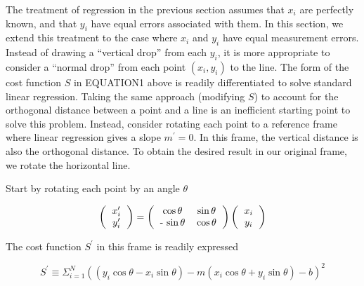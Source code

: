 \documentclass{article}
\begin{document}
The treatment of regression in the previous section assumes that $x_{i}$ are perfectly known, 
and that $y_{i}$ have equal errors associated with them.
In this section, we extend this treatment to the case where $x_{i}$ and $y_{i}$ have equal measurement errors.
Instead of drawing a ``vertical drop'' from each $y_{i}$,
it is more appropriate to consider a ``normal drop'' from each point $ \left( x_{i}, y_{i} \right) $ to the line.
The form of the cost function $S$ in EQUATION1 above is readily differentiated to solve standard linear regression.
Taking the same approach (modifying $S$) to account for the orthogonal distance between a point and a line
 is an inefficient starting point to solve this problem.
Instead, consider rotating each point to a reference frame where linear regression gives a slope $ m^{\prime} = 0 $.
In this frame, the vertical distance is also the orthogonal distance.
To obtain the desired result in our original frame, we rotate the horizontal line.

Start by rotating each point by an angle $ \theta $


\begin{equation}
\left(
\begin{tabular}{c}
$x_{i}^{\prime}$ \\
$y_{i}^{\prime}$
\end{tabular}
\right) = 
\left(
\begin{tabular}{cc}
$ \cos \theta$ & $\sin \theta$ \\
 - $\sin \theta$ & $\cos \theta$ \\
\end{tabular}
\right)
\left(
\begin{tabular}{c}
$x_{i}$ \\
$y_{i}$
\end{tabular}
\right)
\end{equation}

The cost function $S^{\prime}$ in this frame is readily expressed

\begin{equation}
S^{\prime} \equiv \Sigma_{i=1}^{N} \left( \left( y_{i} \cos \theta - x_{i} \sin \theta \right) - m \left( x_{i} \cos \theta + y_{i} \sin \theta \right) - b \right)^{2}
\end{equation}
\end{document}
